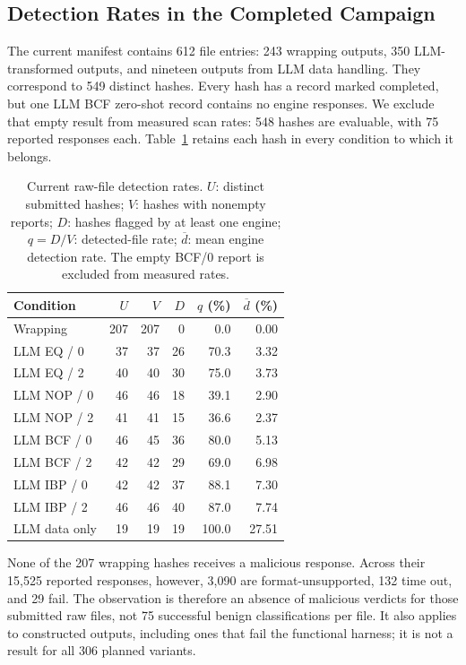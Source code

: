 \subsection{Detection Rates in the Completed Campaign}
The current manifest contains 612 file entries: 243 wrapping outputs,
350 LLM-transformed outputs, and nineteen outputs from LLM data handling.
They correspond to 549 distinct hashes. Every hash has a record marked
completed, but one LLM BCF zero-shot record contains no engine responses.
We exclude that empty result from measured scan rates: 548 hashes are
evaluable, with 75 reported responses each. Table~\ref{tab:current_scans}
retains each hash in every condition to which it belongs.


\begin{table}[t]
\caption{Current raw-file detection rates. $U$: distinct submitted hashes;
$V$: hashes with nonempty reports; $D$: hashes flagged by at least one
engine; $q=D/V$: detected-file rate; $\overline d$: mean engine detection
rate. The empty BCF/0 report is excluded from measured rates.}
\label{tab:current_scans}
\centering\small\setlength{\tabcolsep}{4pt}
\begin{tabular}{@{}lrrrrr@{}}
\toprule
Condition & $U$ & $V$ & $D$ & $q$ (\%) & $\overline d$ (\%) \\
\midrule
Wrapping & 207 & 207 & 0 & 0.0 & 0.00 \\
LLM EQ / 0 & 37 & 37 & 26 & 70.3 & 3.32 \\
LLM EQ / 2 & 40 & 40 & 30 & 75.0 & 3.73 \\
LLM NOP / 0 & 46 & 46 & 18 & 39.1 & 2.90 \\
LLM NOP / 2 & 41 & 41 & 15 & 36.6 & 2.37 \\
LLM BCF / 0 & 46 & 45 & 36 & 80.0 & 5.13 \\
LLM BCF / 2 & 42 & 42 & 29 & 69.0 & 6.98 \\
LLM IBP / 0 & 42 & 42 & 37 & 88.1 & 7.30 \\
LLM IBP / 2 & 46 & 46 & 40 & 87.0 & 7.74 \\
LLM data only & 19 & 19 & 19 & 100.0 & 27.51 \\
\bottomrule
\end{tabular}
\end{table}



None of the 207 wrapping hashes receives a malicious response. Across
their 15,525 reported responses, however, 3,090 are format-unsupported,
132 time out, and 29 fail. The observation is therefore an absence of
malicious verdicts for those submitted raw files, not 75 successful benign
classifications per file. It also applies to constructed outputs, including
ones that fail the functional harness; it is not a result for all 306
planned variants.

